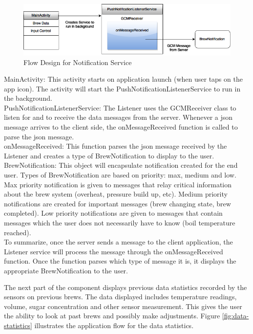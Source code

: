 \documentclass{article}
\begin{document}
\begin{figure}[H]
\begin{center}
\includegraphics[scale=0.60]{gcm-push-notification.png}
\caption{Flow Design for Notification Service}
\label{fig:gcm-push-notification}
\end{center}
\end{figure}

\noindent MainActivity: This activity starts on application launch (when user taps on the app icon). The activity will start the PushNotificationListenerService to run in the background. \\

\noindent PushNotificationListenerService: The Listener uses the GCMReceiver class to listen for and to receive the data messages from the server. Whenever a \gls{json} message arrives to the client side, the onMessageReceived function is called to parse the \gls{json} message. \\

\noindent onMessageReceived: This function parses the \gls{json} message received by the Listener and creates a type of BrewNotification to display to the user. \\

\noindent BrewNotification: This object will encapsulate notification created for the end user. Types of BrewNotification are based on priority: max, medium and low. Max priority notification is given to messages that relay critical information about the brew system (overheat, pressure build up, etc). Medium priority notifications are created for important messages (brew changing state, brew completed). Low priority notifications are given to messages that contain messages which the user does not necessarily have to know (boil temperature reached). \\

To summarize, once the server sends a message to the client application,  the Listener service will process the message through the onMessageReceived function. Once the function parses which type of message it is, it displays the appropriate BrewNotification to the user.

The next part of the component displays previous data statistics recorded by the sensors on previous brews. The data displayed includes temperature readings, volume, sugar concentration and other sensor measurement. This gives the user the ability to look at past brews and possibly make adjustments. Figure \ref{fig:data-statistics} illustrates the application flow for the data statistics. \\
\end{document}
